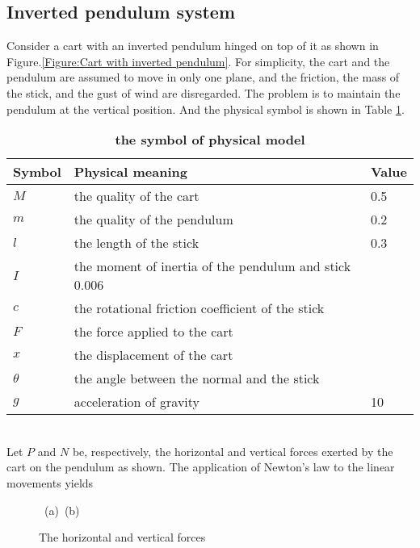 \documentclass[a4paper,11pt]{article}
\begin{document}
\subsection{Inverted pendulum system}
Consider a cart with an inverted pendulum hinged on top of it as shown in Figure.\ref{Figure:Cart with inverted pendulum}. 
For simplicity, the cart and the pendulum are assumed to move in only one plane, and the friction, the mass of the stick, and the gust of wind are disregarded.
The problem is to maintain the pendulum at the vertical position.\cite{chen1999linear} And the physical symbol is shown in Table \ref{tab:symbol}.
\begin{table}[!htbp]
	\centering
	\caption{\textbf{the symbol of physical model}} \label{tab:symbol}
	\begin{tabular}{lll}
	\multicolumn{1}{l|}{Symbol} & Physical meaning            & Value                     \\ \hline
	\multicolumn{1}{l|}{$M$}      & the quality of the cart              &  0.5      \\
	\multicolumn{1}{l|}{$m$}      & the quality of the pendulum           & 0.2       \\
	\multicolumn{1}{l|}{$l$}      & the length of the stick                 & 0.3     \\
	\multicolumn{1}{l|}{$I$}      & the moment of inertia of the pendulum and stick  0.006 \\
	\multicolumn{1}{l|}{$c$}      & the rotational friction coefficient of the stick  \\
	\multicolumn{1}{l|}{$F$}      & the force applied to the cart                   \\
	\multicolumn{1}{l|}{$x$}      & the displacement of the cart                      \\
	\multicolumn{1}{l|}{$\theta$}	   & the angle between the normal and the stick      \\
	\multicolumn{1}{l|}{$g$}	   & acceleration of gravity                         & 10      
	\end{tabular}
\end{table}
\\
Let $P$ and $N$ be, respectively, the horizontal and vertical forces exerted by the cart on the pendulum as shown. The application of Newton’s law to the linear movements yields
\begin{figure}[!hbt]
	\centering
	\mbox{
	(a) \quad\quad
	(b)
	}
	\vspace{15pt}
	\caption{The horizontal and vertical forces}
	\label{Figure:The horizontal and vertical forces}
\end{figure}
\end{document}
